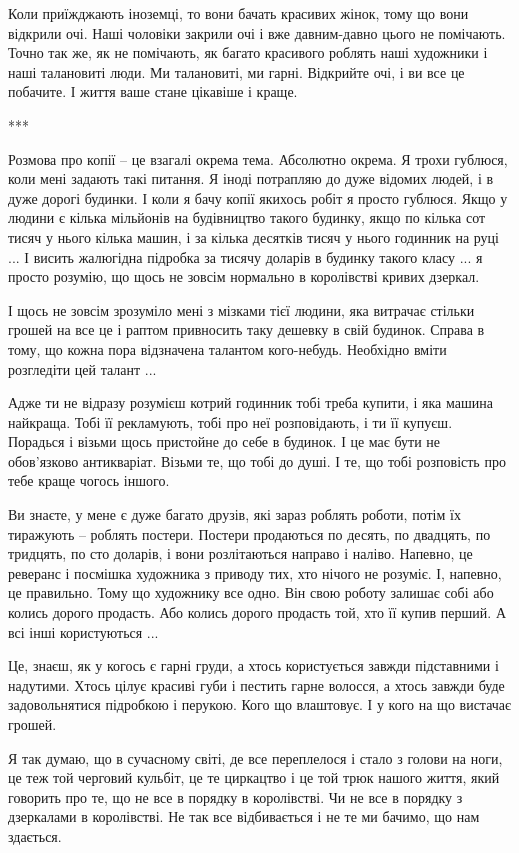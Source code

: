 Коли приїжджають іноземці, то вони бачать красивих жінок, тому що вони відкрили
очі. Наші чоловіки закрили очі і вже давним-давно цього не помічають. Точно так
же, як не помічають, як багато красивого роблять наші художники і наші
талановиті люди.  Ми талановиті, ми гарні. Відкрийте очі, і ви все це побачите.
І життя ваше стане цікавіше і краще.

***

Розмова про копії – це взагалі окрема тема. Абсолютно окрема. Я трохи гублюся,
коли мені задають такі питання. Я іноді потрапляю до дуже відомих людей, і в
дуже дорогі будинки. І коли я бачу копії якихось робіт я просто гублюся. Якщо у
людини є кілька мільйонів на будівництво такого будинку, якщо по кілька сот
тисяч у нього кілька машин, і за кілька десятків тисяч у нього годинник на руці
... І висить жалюгідна підробка за тисячу доларів в будинку такого класу ... я
просто розумію, що щось не зовсім нормально в королівстві кривих дзеркал. 

І щось не зовсім зрозуміло мені з мізками тієї людини, яка витрачає стільки
грошей на все це і раптом привносить таку дешевку в свій будинок. Справа в
тому, що кожна пора відзначена талантом кого-небудь. Необхідно вміти розгледіти
цей талант ... 

Адже ти не відразу розумієш котрий годинник тобі треба купити, і яка машина
найкраща. Тобі її рекламують, тобі про неї розповідають, і ти її купуєш.
Порадься і візьми щось пристойне до себе в будинок. І це має бути не
обов'язково антикваріат. Візьми те, що тобі до душі. І те, що тобі розповість
про тебе краще чогось іншого.

Ви знаєте, у мене є дуже багато друзів, які зараз роблять роботи, потім їх
тиражують – роблять постери. Постери продаються по десять, по двадцять, по
тридцять, по сто доларів, і вони розлітаються направо і наліво. Напевно, це
реверанс і посмішка художника з приводу тих, хто нічого не розуміє. І, напевно,
це правильно. Тому що художнику все одно. Він свою роботу залишає собі або
колись дорого продасть. Або колись дорого продасть той, хто її купив перший. А
всі інші користуються ... 

Це, знаєш, як у когось є гарні груди, а хтось користується завжди підставними і
надутими. Хтось цілує красиві губи і пестить гарне волосся, а хтось завжди буде
задовольнятися підробкою і перукою. Кого що влаштовує. І у кого на що вистачає
грошей. 

Я так думаю, що в сучасному світі, де все переплелося і стало з голови на ноги,
це теж той черговий кульбіт, це те циркацтво і це той трюк нашого життя, який
говорить про те, що не все в порядку в королівстві. Чи не все в порядку з
дзеркалами в королівстві. Не так все відбивається і не те ми бачимо, що нам
здається. 


